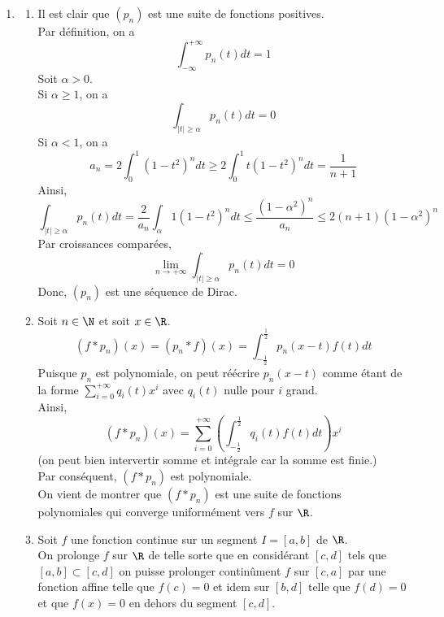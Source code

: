 \documentclass{book}
\begin{document}
\begin{enumerate}[leftmargin=*]
\begin{enumerate}[label=\alph*.]
		De plus, puisque $f$ est continue à valeurs dans un compact, elle est bornée d'après le théorème des bornes atteintes, ainsi il existe $M\in \R$ tel que :
		\[\int_{|t|\geq\alpha}|f(x-t)-f(x)|\chi_n(t)dt\leq 2M\int_{|t|\geq\alpha}\chi_n(t)dt\]
		Puisque $(\chi_n)$ est une séquence de Dirac, il existe $N\in\N$ tel que $\forall n\geq N$, 
		\[\int_{|t|\geq\alpha}\chi_n(t)dt\leq \frac{\varepsilon}{4M}\]
		Par conséquent, pour tout $n\geq N$, on a :
		\[|(f*\chi_n)(x)-f(x)|\leq \frac{\varepsilon}{2}+2M\frac{\varepsilon}{4M}=\varepsilon\]
		Donc : \[\normep{\infty}{(f*\chi_n)-f}\leq \varepsilon\]
		Finalement, $(f*\chi_n)$ converge uniformément vers $f$ sur $\R$.
		\end{enumerate}
		\item\begin{enumerate}
		 \item Il est clair que $(p_n)$ est une suite de fonctions positives.\\
		Par définition, on a \[\int_{-\infty}^{+\infty}p_n(t)dt=1\]
		Soit $\alpha>0$.\\
		Si $\alpha\geq1$, on a \[\int_{|t|\geq\alpha}p_n(t)dt=0\]
		Si $\alpha<1$, on a 
			\[a_n=2\int_{0}^{1}(1-t^2)^ndt\geq2\int_{0}^{1}t(1-t^2)^ndt=\frac{1}{n+1}\]
		Ainsi, \[\int_{|t|\geq\alpha}p_n(t)dt=\frac{2}{a_n}\int_{\alpha}{1}(1-t^2)^ndt\leq \frac{(1-\alpha^2)^n}{a_n}\leq2(n+1)(1-\alpha^2)^n\]
		Par croissances comparées, 
		\[\lim\limits_{n\to+\infty}\int_{|t|\geq\alpha}p_n(t)dt=0\]
		Donc, $(p_n)$ est une séquence de Dirac.
		\item Soit $n\in\N$ et soit $x\in\R$.\\
		\[(f*p_n)(x)=(p_n*f)(x)=\int_{-\frac{1}{2}}^{\frac{1}{2}}p_n(x-t)f(t)dt\]
		Puisque $p_n$ est polynomiale, on peut réécrire $p_n(x-t)$ comme étant de la forme $\displaystyle\sum_{i=0}^{+\infty}q_i(t)x^i$ avec $q_i(t)$ nulle pour $i$ grand.\\
		Ainsi,
		\[(f*p_n)(x)=\sum_{i=0}^{+\infty}\left(\int_{-\frac{1}{2}}^{\frac{1}{2}}q_i(t)f(t)dt\right)x^i\]
		(on peut bien intervertir somme et intégrale car la somme est finie.)\\
		Par conséquent, $(f*p_n)$ est polynomiale.\\
		On vient de montrer que $(f*p_n)$ est une suite de fonctions polynomiales qui converge uniformément vers $f$ sur $\R$.\\
		\item Soit $f$ une fonction continue sur un segment $I=[a,b]$ de $\R$.\\
		On prolonge $f$ sur $\R$ de telle sorte que en considérant $[c,d]$ tels que $[a,b]\subset [c,d]$ on puisse prolonger continûment $f$ sur $[c,a]$ par une fonction affine telle que $f(c)=0$ et idem sur $[b,d]$ telle que $f(d)=0$ et que $f(x)=0$ en dehors du segment $[c,d]$.\\

\end{enumerate}
\end{enumerate}
\end{document}
